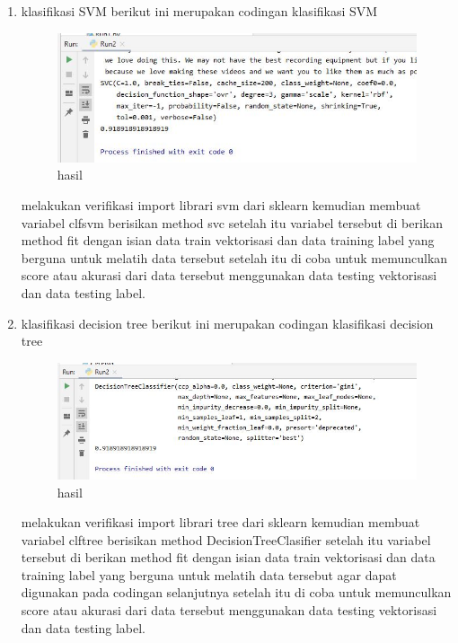 \begin{enumerate}
\item klasifikasi SVM
berikut ini merupakan codingan klasifikasi SVM 

\begin{figure}[ht]
\centering
\includegraphics[scale=0.5]{figures/1174042/chapter4/2,4.JPG}
\caption{hasil}
\label{Praktek no 4}
\end{figure}
melakukan verifikasi import librari svm dari sklearn kemudian membuat variabel clfsvm berisikan method svc setelah itu variabel tersebut di berikan method fit dengan isian data train vektorisasi dan data training label yang berguna untuk melatih data tersebut setelah itu di coba untuk memunculkan score atau akurasi dari data tersebut menggunakan data testing vektorisasi dan data testing label.

\item klasifikasi decision tree 
berikut ini merupakan codingan klasifikasi decision tree

\begin{figure}[ht]
\centering
\includegraphics[scale=0.5]{figures/1174042/chapter4/2,5.JPG}
\caption{hasil}
\label{Praktek no 5}
\end{figure}
melakukan verifikasi import librari tree dari sklearn kemudian membuat variabel clftree berisikan method DecisionTreeClasifier setelah itu variabel tersebut di berikan method fit dengan isian data train vektorisasi dan data training label yang berguna untuk melatih data tersebut agar dapat digunakan pada codingan selanjutnya setelah itu di coba untuk memunculkan score atau akurasi dari data tersebut menggunakan data testing vektorisasi dan data testing label.


\end{enumerate}
